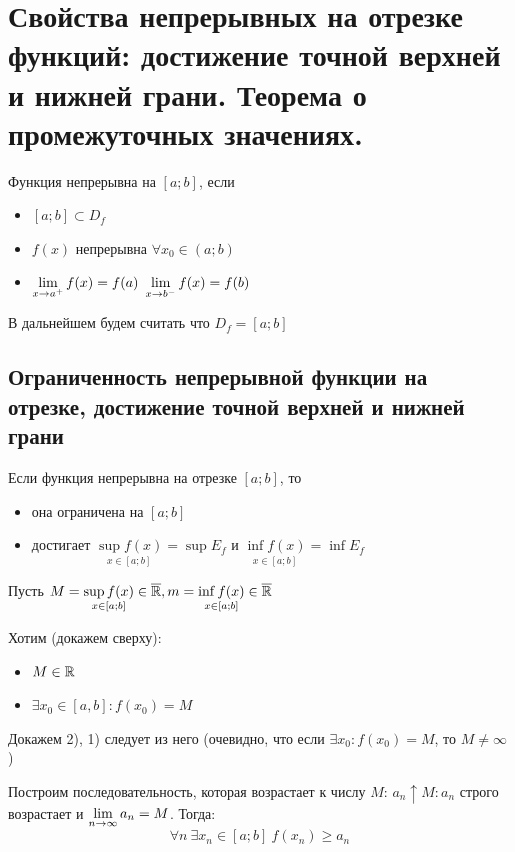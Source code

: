 \section{Свойства непрерывных на отрезке функций:
достижение точной верхней и нижней грани.
Теорема о промежуточных значениях.}

\begin{definition}
    Функция непрерывна на $[a; b]$, если

    \begin{itemize}
        \item[1)] $[a;b] \subset D_f$
        \item[2)] $f(x)$ непрерывна $ \forall x_0 \in (a;b)$
        \item[3)] $\lim\limits_{x \to a^+} f(x) = f(a)\ \lim\limits_{x \to b^-} f(x) = f(b)$
    \end{itemize}
\end{definition}

\begin{remark}
    В дальнейшем будем считать что $D_f = [a;b]$
\end{remark}

\subsection{Ограниченность непрерывной функции на отрезке, достижение точной верхней и нижней грани}

\begin{theorem}
    Если функция непрерывна на отрезке $[a;b]$, то 
    \begin{itemize}
        \item[1)] она ограничена на $[a;b]$
        \item[2)] достигает $\underset{x \in [a;b]}{\sup f(x)} = \sup E_f$ и $\underset{x \in [a;b]}{\inf f(x)} = \inf E_f$
    \end{itemize}
\end{theorem}

\begin{Proof}
    Пусть $M = \underset{x \in [a;b]}{\sup f(x)} \in \overline{\mathbb{R}}, m = \underset{x \in [a;b]}{\inf f(x)} \in \overline{\mathbb{R}}$

    Хотим (докажем сверху):
    \begin{itemize}
        \item[1)] $M \in \mathbb{R}$
        \item[2)] $\exists x_0 \in [a, b] : f(x_0) = M$ 
    \end{itemize}

    Докажем 2), 1) следует из него (очевидно, что если $\exists x_0 : f(x_0) = M$, то $M \neq \infty$)

    Построим последовательность, которая возрастает к числу $M$: $a_n \uparrow M : a_n$ строго возрастает и $\lim\limits_{n \to \infty} a_n = M$. Тогда: 
    \[
        \forall n\ \exists x_n \in [a;b]\ f(x_n) \geq a_n
    \]
\end{Proof}

